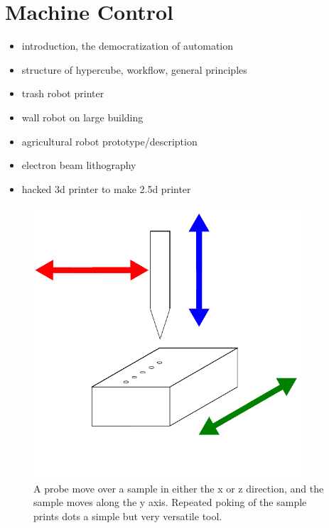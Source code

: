 \section{Machine Control}

\begin{itemize}
\tightlist
\item
introduction, the democratization of automation
\item
structure of hypercube, workflow, general principles
\item
trash robot printer
\item
wall robot on large building
\item
agricultural robot prototype/description
\item
electron beam lithography
\item
hacked 3d printer to make 2.5d printer
\end{itemize}


\begin{figure}
	\centering
	\includegraphics[width=4in]{figures/machines/xyzprobe.png}
	\caption[xyzprobe]
	{A probe move over a sample in either the x or z direction, and the sample moves along the y axis.  Repeated poking of the sample prints dots a simple but very versatile tool.}
\end{figure}


